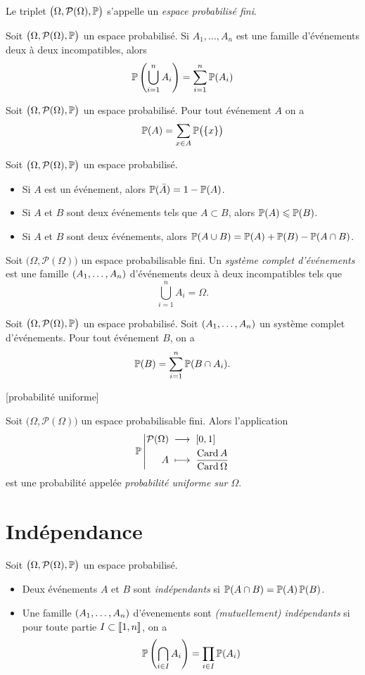 \documentclass{yann}
\newcommand{\Part}{\mathcal{P}}
\newcommand{\Pro}{\bigl(\Omega, \Part(\Omega)\bigr)}
\newcommand{\Prob}{\bigl(\Omega, \Part(\Omega), \P\bigr)}
\begin{document}
Le triplet $\Prob$ s'appelle un \emph{espace probabilisé fini}.


Soit $\Prob$ un espace probabilisé.
Si $A_1, \dots, A_n$ est une famille d'événements deux à deux incompatibles,
alors \[ \P\left( \bigcup_{i=1}^n A_i \right) = \sum_{i=1}^n \P(A_i) \]


Soit $\Prob$ un espace probabilisé.
Pour tout événement $A$ on a
\[ \P(A) = \sum_{x\in A} \P\bigl(\{x\}\bigr) \]


Soit $\Prob$ un espace probabilisé.
\begin{itemize}
\item
Si $A$ est un événement, alors $\P(\bar A) = 1 - \P(A)$.
\item
Si $A$ et $B$ sont deux événements tels que $A\subset B$, alors $\P(A)\leq\P(B)$.
\item
Si $A$ et $B$ sont deux événements, alors $\P(A\cup B)=\P(A)+\P(B)-\P(A\cap B)$.
\end{itemize}


Soit $\Pro$ un espace probabilisable fini.
Un \emph{système complet d'événements} est une famille $\nUplet A1n$
d'événements deux à deux incompatibles tels que
\[ \bigcup_{i=1}^n A_i = \Omega. \]


Soit $\Prob$ un espace probabilisé.
Soit $\nUplet A1n$ un système complet d'événements.
Pour tout événement $B$, on a
\[ \P(B) = \sum_{i=1}^n \P(B\cap A_i). \]

[probabilité uniforme]

Soit $\Pro$ un espace probabilisable fini.
Alors l'application
\[ \Fonction{\P}{\Part(\Omega)}{[0,1]}{A}{\frac{\Card{A}}{\Card{\Omega}}} \]
est une probabilité appelée \emph{probabilité uniforme sur $\Omega$}.

\section{Indépendance}


Soit $\Prob$ un espace probabilisé.
\begin{itemize}
\item
Deux événements $A$ et $B$ sont \emph{indépendants} si $\P(A\cap B)=\P(A)\P(B)$.
\item
Une famille $\nUplet A1n$ d'évenements sont \emph{(mutuellement) indépendants}
  si pour toute partie $I\subset\Dcro{1,n}$, on a
  \[ \P\left( \bigcap_{i\in I} A_i \right) = \prod_{i\in I} \P(A_i) \]
\end{itemize}
\end{document}
